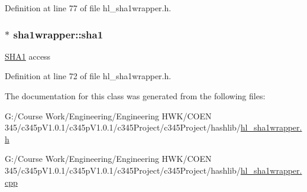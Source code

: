 Definition at line 77 of file hl\_\-sha1wrapper.h.\hypertarget{classsha1wrapper_ad0360326a2201b79786f0dd2fcc42279}{
\subsubsection[{sha1}]{$\ast$ {\bf sha1wrapper::sha1}}}
\label{classsha1wrapper_ad0360326a2201b79786f0dd2fcc42279}
\hyperlink{class_s_h_a1}{SHA1} access 

Definition at line 72 of file hl\_\-sha1wrapper.h.

The documentation for this class was generated from the following files:\begin{DoxyCompactItemize}
\item 
G:/Course Work/Engineering/Engineering HWK/COEN 345/c345pV1.0.1/c345pV1.0.1/c345Project/c345Project/hashlib/\hyperlink{hl__sha1wrapper_8h}{hl\_\-sha1wrapper.h}\item 
G:/Course Work/Engineering/Engineering HWK/COEN 345/c345pV1.0.1/c345pV1.0.1/c345Project/c345Project/hashlib/\hyperlink{hl__sha1wrapper_8cpp}{hl\_\-sha1wrapper.cpp}\end{DoxyCompactItemize}
